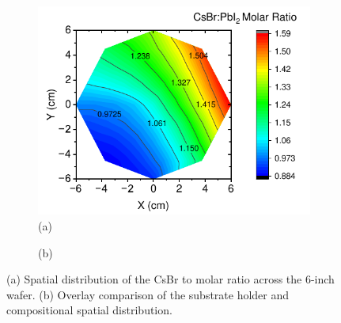 \begin{figure}[htbp]
    \centering
    \begin{subfigure}[t]{0.6\textwidth}
        \centering
        \includegraphics[width=\textwidth]{chapters/stability/imeges/Molar_Ratio.pdf} %
        \caption*{(a)}
    \end{subfigure}
    \begin{subfigure}[t]{0.25\textwidth}
        \centering
        \caption*{(b)}
    \end{subfigure}

\caption{(a) Spatial distribution of the CsBr to  molar ratio across the 6-inch wafer. (b) Overlay comparison of the substrate holder and compositional spatial distribution.}
\label{fig:stability:ellipsometry:molar_ratio}

\end{figure}


